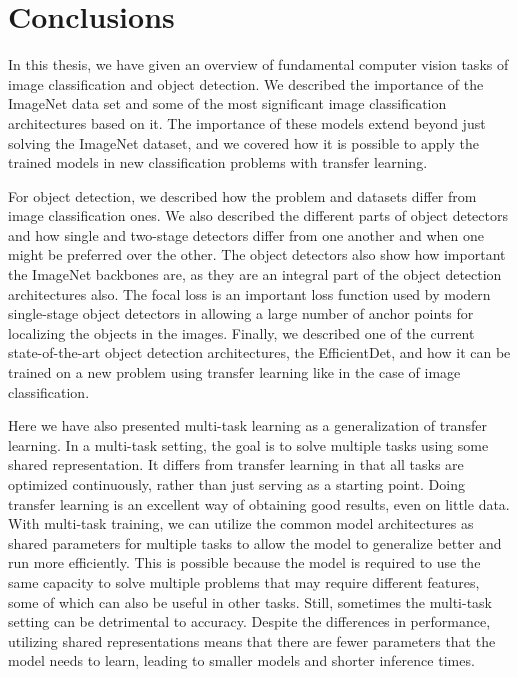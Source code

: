 \chapter{Conclusions}
In this thesis, we have given an overview of fundamental computer vision tasks of image classification and object detection.
We described the importance of the ImageNet data set and some of the most significant image classification architectures based on it.
The importance of these models extend beyond just solving the ImageNet dataset, and we covered how it is possible to apply the trained models in new classification problems with transfer learning.

For object detection, we described how the problem and datasets differ from image classification ones.
We also described the different parts of object detectors and how single and two-stage detectors differ from one another and when one might be preferred over the other.
The object detectors also show how important the ImageNet backbones are, as they are an integral part of the object detection architectures also.
The focal loss is an important loss function used by modern single-stage object detectors in allowing a large number of anchor points for localizing the objects in the images.
Finally, we described one of the current state-of-the-art object detection architectures, the EfficientDet, and how it can be trained on a new problem using transfer learning like in the case of image classification.

Here we have also presented multi-task learning as a generalization of transfer learning.
In a multi-task setting, the goal is to solve multiple tasks using some shared representation. 
It differs from transfer learning in that all tasks are optimized continuously, rather than just serving as a starting point.
Doing transfer learning is an excellent way of obtaining good results, even on little data.
With multi-task training, we can utilize the common model architectures as shared parameters for multiple tasks to allow the model to generalize better and run more efficiently.
This is possible because the model is required to use the same capacity to solve multiple problems that may require different features, some of which can also be useful in other tasks. 
Still, sometimes the multi-task setting can be detrimental to accuracy.
Despite the differences in performance, utilizing shared representations means that there are fewer parameters that the model needs to learn, leading to smaller models and shorter inference times.


